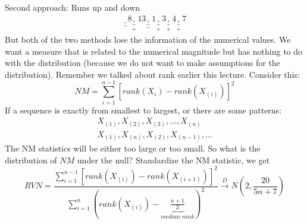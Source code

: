 \documentclass[twoside]{article}
\begin{document}
	Second approach: Runs up and down
	\begin{align}
		\underbrace{\;}_{-} 8 \underbrace{,}_{+} 13 \underbrace{,}_{-} 1 \underbrace{,}_{+} 3 \underbrace{,}_{+} 4 \underbrace{,}_{+} 7 \tag{2}
	\end{align}
	But both of the two methods lose the information of the numerical values. We want a measure that is related to the numerical magnitude but has nothing to do with the distribution (because we do not want to make assumptions for the distribution). Remember we talked about rank earlier this lecture. Consider this:
	$$
	NM = \sum_{i=1}^{n-1} \left[ rank \left( X_i \right) - rank \left( X_{(i)} \right) \right]^2
	$$
	If a sequence is exactly from smallest to largest, or there are some patterns:
	\begin{align}
		X_{(1)}, X_{(2)}, X_{(3)}, ..., X_{(n)} \tag{3} \\
		X_{(1)}, X_{(n)}, X_{(2)}, X_{(n-1)}, ... \tag{4}
	\end{align}
	The NM statistics will be either too large or too small. So what is the distribution of $NM$ under the null? Standardize the NM statistic, we get
	$$
	RVN = \frac{\sum_{i=1}^{n-1} \left[ rank \left( X_{(i)} \right) - rank \left( X_{(i+1)} \right) \right]^2}{\sum_{i=1}^{n} ( rank (X_{(i)}) - \underbrace{\frac{n+1}{2}}_{median \; rank} )^2} \xrightarrow{D} N(2, \frac{20}{5n+7})
	$$
	
\end{document}
